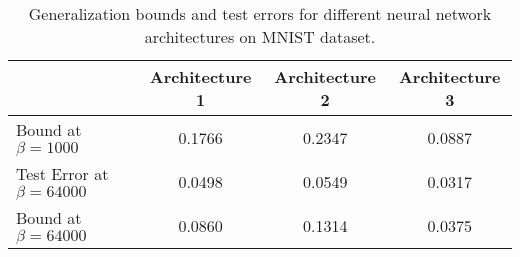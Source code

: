 
\begin{table}[h]
\centering
\begin{tabular}{|l|c|c|c|}
\hline
& Architecture 1 & Architecture 2 & Architecture 3 \\
\hline
Bound at $\beta = 1000$ & 0.1766 & 0.2347 & 0.0887 \\
\hline
Test Error at $\beta = 64000$ & 0.0498 & 0.0549 & 0.0317 \\
\hline
Bound at $\beta = 64000$ & 0.0860 & 0.1314 & 0.0375 \\
\hline
\end{tabular}
\caption{Generalization bounds and test errors for different neural network architectures on MNIST dataset.}
\label{tab:mnist_results}
\end{table}
